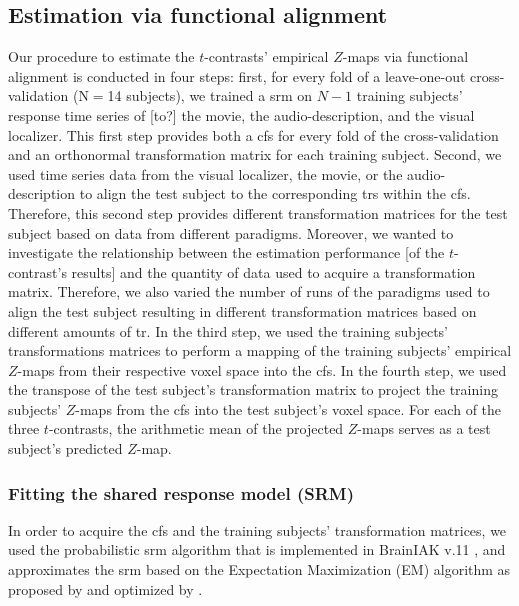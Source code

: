 \subsection{Estimation via functional alignment}
%
Our procedure to estimate the $t$-contrasts' empirical $Z$-maps via functional
alignment is conducted in four steps:
first, for every fold of a leave-one-out cross-validation (N$=$14 subjects), we
trained a \ac{srm} on $N-1$ training subjects' response time series
of [to?] the movie, the audio-description, and the visual localizer.
This first step provides both a \ac{cfs} for every fold of the cross-validation
and an orthonormal transformation matrix for each training subject.
Second, we used time series data from the visual localizer, the movie, or the
audio-description to align the test subject to the corresponding \acp{tr} within
the \ac{cfs}.
%
Therefore, this second step provides different transformation matrices for the
test subject based on data from different paradigms.
Moreover, we wanted to investigate the relationship between the estimation
performance [of the $t$-contrast's results] and the quantity of data used to
acquire a transformation matrix.
Therefore, we also varied the number of runs of the paradigms used to align the
test subject resulting in different transformation matrices based on different
amounts of \ac{tr}.
In the third step, we used the training subjects' transformations matrices to
perform a mapping of the training subjects' empirical $Z$-maps from their
respective voxel space into the \ac{cfs}.
In the fourth step, we used the transpose of the test subject's transformation
matrix to project the training subjects' $Z$-maps from the \ac{cfs} into the
test subject's voxel space.
For each of the three $t$-contrasts, the arithmetic mean of the projected
$Z$-maps serves as a test subject's predicted $Z$-map.



\subsubsection{Fitting the shared response model (SRM)}

%
In order to acquire the \ac{cfs} and the training subjects' transformation
matrices, we used the probabilistic \ac{srm} algorithm that is implemented in
BrainIAK v.11 \citep[Brain Imaging Analysis Kit;][]{kumar2020brainiak,
kumar2020brainiaktutorial}, and approximates the \ac{srm} based on the
Expectation Maximization (EM) algorithm as proposed by \citet{chen2015reduced}
and optimized by \citet{anderson2016enabling}.


